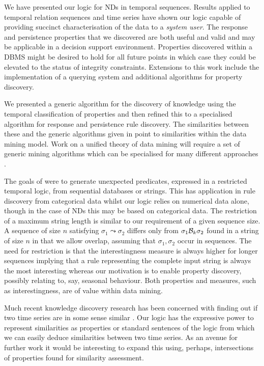 \medskip
 
We have presented our logic for NDs in temporal sequences. Results
applied to temporal relation sequences and time series have shown our
logic capable of providing succinct characterisation of the data to a
{\em system user}. The response and persistence properties that we
discovered are both useful and 
valid and may be applicable in a decision support
environment. Properties discovered within a DBMS might be
desired to hold for all future points in which case they could be
elevated to the status of integrity constraints. 
Extensions to this work include the implementation of a
querying system and additional algorithms for property discovery.

\medskip
We presented a generic algorithm for the discovery of knowledge using
the temporal classification of properties and then refined this to a
specialised algorithm for response and persistence rule discovery.
The similarities between
these and the generic algorithms given in \cite{man96,man97} point to
similarities within the data mining model. Work on a unified theory of
data mining will require a set of generic mining algorithms which can
be specialised for many different approaches \cite{jmw96}.
\medskip 

The goals of \cite{bt98} were to generate unexpected predicates,
expressed in a restricted temporal logic, from sequential databases or
strings. This has application in rule discovery from categorical data
whilst our logic relies on numerical data alone, though in the case of
NDs this may be based on categorical data. The restriction of a
maximum string length is similar to our requirement of a given
sequence size. A sequence of size $n$ satisfying $\sigma_1 \leadsto
\sigma_2$ differs only from $\sigma_1 {\cal B}_k 
\sigma_2$ found in a string of size $n$ in that we allow overlap,
assuming that $\sigma_1,\sigma_2$ occur in sequences. The need
for restriction is 
that the interestingness measure is always higher for longer sequences
implying that a rule representing the complete input string is always
the most interesting whereas our motivation is to enable property
discovery, possibly relating to, say, seasonal behaviour.
Both properties and measures, such as interestingness, are of value
within data mining.

\smallskip

Much recent knowledge discovery research has been concerned with
finding out if two time series are in some sense similar
\cite{frm94,alss95,dgm97}. Our logic has the expressive power to represent
similarities as properties or standard sentences of the logic from
which we can easily deduce similarities between two time series. As an
avenue for further work it
would be interesting to expand this using, perhaps, intersections of
properties found for similarity assessment.
